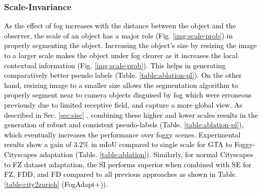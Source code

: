\documentclass[final,5p,times,twocolumn]{elsarticle}
\begin{document}
\subsubsection{Scale-Invariance}
\textcolor{black}{
As the effect of fog increases with the distance between the object and the observer, the scale of an object has a major role (Fig. \ref{img:scale-prob}) in properly segmenting the object. 
\textcolor{black}{Increasing the object's size by resizing the image to a larger scale makes the object under fog clearer as it increases the local contextual information (Fig. \ref{img:scale-prob}). }
This helps in generating comparatively better pseudo labels (Table. \ref{table:ablation-pl}).  
On the other hand, resizing image to a smaller size allows the segmentation algorithm to properly segment near to camera objects disguised by fog which were erroneous previously due to limited receptive field, and capture a more global view. 
\textcolor{black}{As described in Sec. \ref{sec:sisc} , combining these higher and lower scales results in the generation of robust and consistent pseudo-labels (Table. \ref{table:ablation-pl}), which eventually increases the performance over foggy scenes.}
Experimental results show a gain of $3.2\%$ in mIoU compared to single scale for GTA to Foggy-Cityscapes adaptation (Table. \ref{table:ablation}). Similarly, for normal Cityscapes to FZ dataset adaptation, the SI performs superior when combined with SE for FZ, FDD, and FD compared to all previous approaches as shown in Table. \ref{table:city2zurich} (FogAdapt+)).
}

\begin{table}[H]
\footnotesize
\centering
\caption{Effect of incorporating uncertainty weighted scale invariance on the quality of pseudo-labels. Here wSI is Weighted Scale-Invariance.}
\label{table:ablation-pl}
\end{table}
\end{document}
